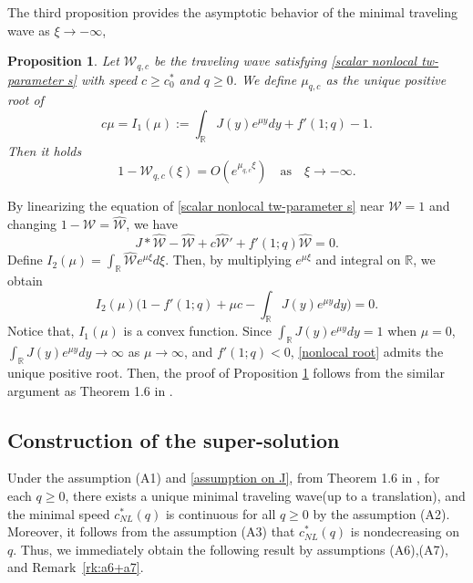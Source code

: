 \documentclass[11pt,a4paper]{article}
\newtheorem{proposition}[theorem]{\textbf{Proposition}}
\numberwithin{equation}{section}
\numberwithin{figure}{section}
\begin{document}
The third proposition provides the asymptotic behavior of the minimal traveling wave as $\xi\to-\infty$,
\begin{proposition}\label{prop: asy tw - infty nonlocal}
Let $\mathcal{W}_{q,c}$ be the traveling wave satisfying \eqref{scalar nonlocal tw-parameter s} with speed $c\ge c^*_0$ and $q\ge 0$.
We define $\mu_{q,c}$ as the unique positive root of
\begin{equation}\label{nonlocal root}
c\mu=I_1(\mu):=\int_{\mathbb{R}}J(y)e^{\mu y}dy+f'(1;q)-1.
\end{equation}
Then it holds
\begin{equation*}%
1-\mathcal{W}_{q,c}(\xi)=O(e^{\mu_{q,c}\xi})\quad\text{as}\quad \xi\to-\infty.
\end{equation*}
\end{proposition}
By linearizing the equation of \eqref{scalar nonlocal tw-parameter s} near $\mathcal{W}=1$ and changing $1-\mathcal{W}=\hat{\mathcal{W}}$, we have
$$J\ast\hat{\mathcal{W}}-\hat{\mathcal{W}}+c\hat{\mathcal{W}}'+f'(1;q)\hat{\mathcal{W}}=0.$$
Define
$I_2(\mu)=\int_{\mathbb{R}}\hat{\mathcal{W}}e^{\mu\xi}d\xi.$
Then, by multiplying $e^{\mu \xi}$ and integral on $\mathbb{R}$, we obtain
$$I_2(\mu)\Big(1-f'(1;q)+\mu c-\int_{\mathbb{R}}J(y)e^{\mu y}dy\Big)=0.$$
Notice that, $I_1(\mu)$ is a convex function.
Since $\int_{\mathbb{R}}J(y)e^{\mu y}dy=1$ when $\mu=0$, $\int_{\mathbb{R}}J(y)e^{\mu y}dy\to \infty$ as $\mu\to\infty$, and $f'(1;q)<0$, \eqref{nonlocal root} admits the unique positive root. Then, the proof of Proposition \ref{prop: asy tw - infty nonlocal} follows from the similar argument as Theorem 1.6 in \cite{Coville}.



\subsection{Construction of the super-solution}\label{subsec-3-1}

\noindent

Under the assumption (A1) and \eqref{assumption on J}, from Theorem 1.6 in \cite{Coville}, for each $q\geq0$, there exists a unique minimal traveling wave(up to a translation), and the minimal speed $c_{NL}^*(q)$ is continuous for all $q\ge 0$ by the assumption (A2).
Moreover, it follows from the assumption (A3) that $c_{NL}^*(q)$ is nondecreasing on $q$. Thus, we immediately obtain the following result by assumptions (A6),(A7), and Remark~\ref{rk:a6+a7}.
\end{document}

